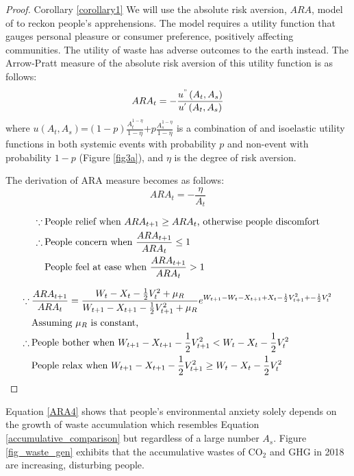 \documentclass[sn-basic]{sn-jnl}%
\theoremstyle{thmstyleone}%
\theoremstyle{thmstyletwo}%
\theoremstyle{thmstylethree}%
\begin{document}
\begin{proof}{Corollary \ref{corollary1}}
    We will use the absolute risk aversion, $ARA$, model of \citet{pratt1978risk} to reckon people’s apprehensions. The model requires a utility function that gauges personal pleasure or consumer preference, positively affecting communities. The utility of waste has adverse outcomes to the earth instead. The Arrow-Pratt measure of the absolute risk aversion of this utility function is as follows: 
    \begin{equation}\label{ARA}
        ARA_t=-\frac{u^{"}\left(A_t, A_s\right)}{u^{'}\left(A_t, A_s\right)}
    \end{equation}
    where $u\left(A_t, A_s\right)$=$\left(1-p\right) \frac{A_t^{1-\eta}}{1-\eta}$+$p \frac{A_s^{1-\eta}}{1-\eta}$ is a combination of \citeauthor{von2007theory} and isoelastic utility functions in both systemic events with probability $p$ and non-event with probability $1-p$ (Figure \ref{fig3a}), and $\eta$ is the degree of risk aversion.
    
    The derivation of ARA measure becomes as follows:
    \begin{equation}\label{ARA2}
        ARA_t=-\frac{\eta}{A_t}
    \end{equation}

    \begin{align}\label{ARA3}
    \because \: & \mbox{People relief when } ARA_{t+1}\geq ARA_t \mbox{, otherwise people discomfort} \notag\\
    \therefore \: &\mbox{People concern when } \frac{ARA_{t+1}}{ARA_t}\leq 1 \notag\\
        &\mbox{People feel at ease when } \frac{ARA_{t+1}}{ARA_t} > 1 
    \end{align}

    \begin{align}\label{ARA4}
        \because \: &\frac{ARA_{t+1}}{ARA_t}=\frac{W_t-X_t-\frac{1}{2}V_t^2+\mu_R}{W_{t+1}-X_{t+1}-\frac{1}{2}V_{t+1}^2+\mu_R}e^{W_{t+1}-W_t-X_{t+1}+X_t-\frac{1}{2}V_{t+1}^2+-\frac{1}{2}V_t^2} \notag\\
        &\mbox{Assuming } \mu_R \mbox{ is constant,} \notag\\
        \therefore \: & \mbox{People bother when } W_{t+1}-X_{t+1}-\frac{1}{2}V_{t+1}^2 < W_t-X_t-\frac{1}{2}V_t^2 \notag\\
        & \mbox{People relax when } W_{t+1}-X_{t+1}-\frac{1}{2}V_{t+1}^2 \geq W_t-X_t-\frac{1}{2}V_t^2
    \end{align}
\end{proof} 
Equation \ref{ARA4} shows that people’s environmental anxiety solely depends on the growth of waste accumulation which resembles Equation \ref{accumulative_comparison} but regardless of a large number $A_s$. Figure \ref{fig_waste_gen} exhibits that the accumulative wastes of CO$_2$ and GHG in 2018 are increasing, disturbing people.
\end{document}

